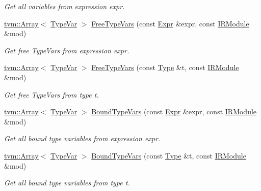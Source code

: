 \begin{DoxyCompactItemize}
\begin{DoxyCompactList}\small\item\em Get all variables from expression expr. \end{DoxyCompactList}\item 
\hyperlink{classtvm_1_1Array}{tvm\+::\+Array}$<$ \hyperlink{namespacetvm_1_1relay_a63321eb51080f3f57dd7563a3ca0bfa6}{Type\+Var} $>$ \hyperlink{namespacetvm_1_1relay_acc529cca9623ac81c8aa6e106cdb5850}{Free\+Type\+Vars} (const \hyperlink{namespacetvm_1_1relay_a5b84e3790f89bb3fad5c7911eeb99531}{Expr} \&expr, const \hyperlink{classtvm_1_1IRModule}{I\+R\+Module} \&mod)
\begin{DoxyCompactList}\small\item\em Get free Type\+Vars from expression expr. \end{DoxyCompactList}\item 
\hyperlink{classtvm_1_1Array}{tvm\+::\+Array}$<$ \hyperlink{namespacetvm_1_1relay_a63321eb51080f3f57dd7563a3ca0bfa6}{Type\+Var} $>$ \hyperlink{namespacetvm_1_1relay_a446e2b12f3e907336313004c3e0a0c86}{Free\+Type\+Vars} (const \hyperlink{namespacetvm_1_1relay_a661d95f170bca230773914caeef3fe52}{Type} \&t, const \hyperlink{classtvm_1_1IRModule}{I\+R\+Module} \&mod)
\begin{DoxyCompactList}\small\item\em Get free Type\+Vars from type t. \end{DoxyCompactList}\item 
\hyperlink{classtvm_1_1Array}{tvm\+::\+Array}$<$ \hyperlink{namespacetvm_1_1relay_a63321eb51080f3f57dd7563a3ca0bfa6}{Type\+Var} $>$ \hyperlink{namespacetvm_1_1relay_a1e5aa65b13f8ca172009aa2ff3ba59d6}{Bound\+Type\+Vars} (const \hyperlink{namespacetvm_1_1relay_a5b84e3790f89bb3fad5c7911eeb99531}{Expr} \&expr, const \hyperlink{classtvm_1_1IRModule}{I\+R\+Module} \&mod)
\begin{DoxyCompactList}\small\item\em Get all bound type variables from expression expr. \end{DoxyCompactList}\item 
\hyperlink{classtvm_1_1Array}{tvm\+::\+Array}$<$ \hyperlink{namespacetvm_1_1relay_a63321eb51080f3f57dd7563a3ca0bfa6}{Type\+Var} $>$ \hyperlink{namespacetvm_1_1relay_a419979c48a5e37cd969f6fd6d0fead4b}{Bound\+Type\+Vars} (const \hyperlink{namespacetvm_1_1relay_a661d95f170bca230773914caeef3fe52}{Type} \&t, const \hyperlink{classtvm_1_1IRModule}{I\+R\+Module} \&mod)
\begin{DoxyCompactList}\small\item\em Get all bound type variables from type t. \end{DoxyCompactList}\item 

\end{DoxyCompactItemize}
